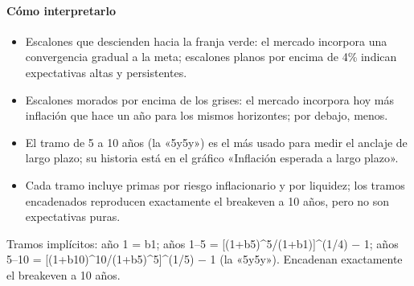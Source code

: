 \paragraph{Cómo interpretarlo}
\begin{itemize}
\item Escalones que descienden hacia la franja verde: el mercado incorpora una convergencia gradual a la meta; escalones planos por encima de 4\% indican expectativas altas y persistentes.
\item Escalones morados por encima de los grises: el mercado incorpora hoy más inflación que hace un año para los mismos horizontes; por debajo, menos.
\item El tramo de 5 a 10 años (la «5y5y») es el más usado para medir el anclaje de largo plazo; su historia está en el gráfico «Inflación esperada a largo plazo».
\item Cada tramo incluye primas por riesgo inflacionario y por liquidez; los tramos encadenados reproducen exactamente el breakeven a 10 años, pero no son expectativas puras.
\end{itemize}
\begin{formulas}[Fórmulas]
\end{formulas}
\begin{metodo}[Metodología]
Tramos implícitos: año 1 = b1; años 1–5 = [(1+b5)\textasciicircum{}5/(1+b1)]\textasciicircum{}(1/4) − 1; años 5–10 = [(1+b10)\textasciicircum{}10/(1+b5)\textasciicircum{}5]\textasciicircum{}(1/5) − 1 (la «5y5y»). Encadenan exactamente el breakeven a 10 años.
\par{}
\end{metodo}

